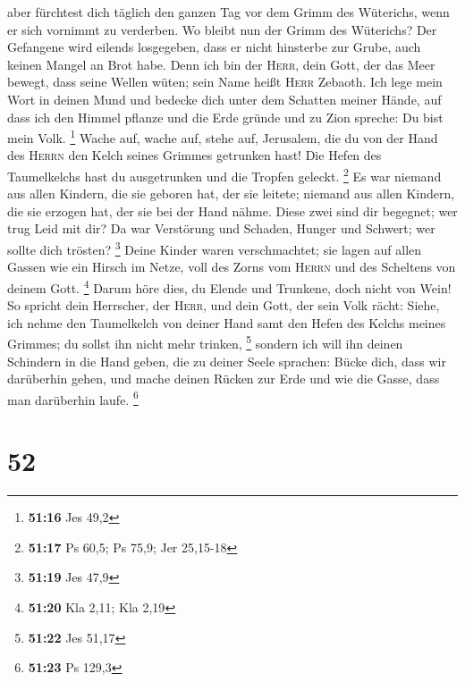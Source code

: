 aber fürchtest dich täglich den ganzen Tag vor dem Grimm des Wüterichs,
wenn er sich vornimmt zu verderben. Wo bleibt nun der Grimm des
Wüterichs?  Der Gefangene wird eilends losgegeben, dass
er nicht hinsterbe zur Grube, auch keinen Mangel an Brot habe.
 Denn ich bin der \textsc{Herr}, dein Gott, der das Meer
bewegt, dass seine Wellen wüten; sein Name heißt \textsc{Herr} Zebaoth.
 Ich lege mein Wort in deinen Mund und bedecke dich unter
dem Schatten meiner Hände, auf dass ich den Himmel pflanze und die Erde
gründe und zu Zion spreche: Du bist mein Volk. \footnote{\textbf{51:16}
  Jes 49,2}  Wache auf, wache auf, stehe auf, Jerusalem,
die du von der Hand des \textsc{Herrn} den Kelch seines Grimmes
getrunken hast! Die Hefen des Taumelkelchs hast du ausgetrunken und die
Tropfen geleckt. \footnote{\textbf{51:17} Ps 60,5; Ps 75,9; Jer 25,15-18}
 Es war niemand aus allen Kindern, die sie geboren hat,
der sie leitete; niemand aus allen Kindern, die sie erzogen hat, der sie
bei der Hand nähme.  Diese zwei sind dir begegnet; wer
trug Leid mit dir? Da war Verstörung und Schaden, Hunger und Schwert;
wer sollte dich trösten? \footnote{\textbf{51:19} Jes 47,9}
 Deine Kinder waren verschmachtet; sie lagen auf allen
Gassen wie ein Hirsch im Netze, voll des Zorns vom \textsc{Herrn} und
des Scheltens von deinem Gott. \footnote{\textbf{51:20} Kla 2,11; Kla
  2,19}  Darum höre dies, du Elende und Trunkene, doch
nicht von Wein!  So spricht dein Herrscher, der
\textsc{Herr}, und dein Gott, der sein Volk rächt: Siehe, ich nehme den
Taumelkelch von deiner Hand samt den Hefen des Kelchs meines Grimmes; du
sollst ihn nicht mehr trinken, \footnote{\textbf{51:22} Jes 51,17}
 sondern ich will ihn deinen Schindern in die Hand geben,
die zu deiner Seele sprachen: Bücke dich, dass wir darüberhin gehen, und
mache deinen Rücken zur Erde und wie die Gasse, dass man darüberhin
laufe. \footnote{\textbf{51:23} Ps 129,3}

\hypertarget{section-18}{%
\section{52}\label{section-18}}

